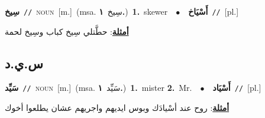 \documentclass[10pt,a4paper,twoside]{article} %
\begin{document}
\begin{multicols}{2}
{\setlength\topsep{0pt}\textbf{\foreignlanguage{arabic}{سِيخ}}\ {\color{gray}\texttt{//}\color{black}}\ \textsc{noun}\ [m.]\ \color{gray}(msa. \foreignlanguage{arabic}{سِيخ}~\foreignlanguage{arabic}{\textbf{١.}})\color{black}\ \textbf{1.}~skewer\ \ $\bullet$\ \ \setlength\topsep{0pt}\textbf{\foreignlanguage{arabic}{أَسْيَاخ}}\ {\color{gray}\texttt{//}\color{black}}\ [pl.]\  \begin{flushright}\color{gray}\foreignlanguage{arabic}{\textbf{\underline{\foreignlanguage{arabic}{أمثلة}}}: حطَّتلي سِيخ كباب وسِيخ لحمة}\end{flushright}\color{black}} \vspace{2mm}

\vspace{-3mm}
\subsection*{\color{blue}\foreignlanguage{arabic}{س.ي.د}\color{blue}{}} 

{\setlength\topsep{0pt}\textbf{\foreignlanguage{arabic}{سَيِّد}}\ {\color{gray}\texttt{//}\color{black}}\ \textsc{noun}\ [m.]\ \color{gray}(msa. \foreignlanguage{arabic}{سَيِّد}~\foreignlanguage{arabic}{\textbf{١.}})\color{black}\ \textbf{1.}~mister  \textbf{2.}~Mr.\ \ $\bullet$\ \ \setlength\topsep{0pt}\textbf{\foreignlanguage{arabic}{أَسْيَاد}}\ {\color{gray}\texttt{//}\color{black}}\ [pl.]\  \begin{flushright}\color{gray}\foreignlanguage{arabic}{\textbf{\underline{\foreignlanguage{arabic}{أمثلة}}}: روح عند أسْيادَك وبوس ايديهم واجريهم عشان يطلعوا أخوك}\end{flushright}\color{black}} \vspace{2mm}


\end{multicols}
\end{document}
